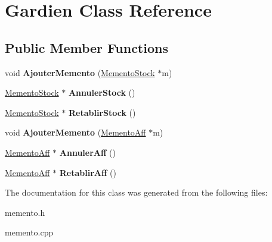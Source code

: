 \hypertarget{class_gardien}{\section{Gardien Class Reference}
\label{class_gardien}
}
\subsection*{Public Member Functions}
\begin{DoxyCompactItemize}
\item 
\hypertarget{class_gardien_a25ff2936955eb98a8eef1fbe4dc0b9d0}{void {\bfseries Ajouter\-Memento} (\hyperlink{class_memento_stock}{Memento\-Stock} $\ast$m)}\label{class_gardien_a25ff2936955eb98a8eef1fbe4dc0b9d0}

\item 
\hypertarget{class_gardien_a01fe8e7e99114ecc5979a9109001c24d}{\hyperlink{class_memento_stock}{Memento\-Stock} $\ast$ {\bfseries Annuler\-Stock} ()}\label{class_gardien_a01fe8e7e99114ecc5979a9109001c24d}

\item 
\hypertarget{class_gardien_a106f068a93a38b146201d6dc8d9b06e6}{\hyperlink{class_memento_stock}{Memento\-Stock} $\ast$ {\bfseries Retablir\-Stock} ()}\label{class_gardien_a106f068a93a38b146201d6dc8d9b06e6}

\item 
\hypertarget{class_gardien_ab24502a38d3078c3c24510e13a6486ee}{void {\bfseries Ajouter\-Memento} (\hyperlink{class_memento_aff}{Memento\-Aff} $\ast$m)}\label{class_gardien_ab24502a38d3078c3c24510e13a6486ee}

\item 
\hypertarget{class_gardien_ad607200bff6e2b690ab5b065c77cbd7b}{\hyperlink{class_memento_aff}{Memento\-Aff} $\ast$ {\bfseries Annuler\-Aff} ()}\label{class_gardien_ad607200bff6e2b690ab5b065c77cbd7b}

\item 
\hypertarget{class_gardien_af2bee95e5eee42060dd738ad73187b5c}{\hyperlink{class_memento_aff}{Memento\-Aff} $\ast$ {\bfseries Retablir\-Aff} ()}\label{class_gardien_af2bee95e5eee42060dd738ad73187b5c}

\end{DoxyCompactItemize}


The documentation for this class was generated from the following files\-:\begin{DoxyCompactItemize}
\item 
memento.\-h\item 
memento.\-cpp\end{DoxyCompactItemize}
